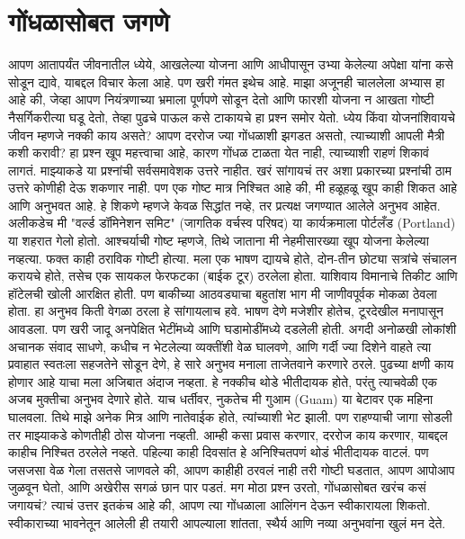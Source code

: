  \chapter{गोंधळासोबत जगणे}
आपण आतापर्यंत जीवनातील ध्येये, आखलेल्या योजना आणि आधीपासून उभ्या केलेल्या अपेक्षा यांना कसे सोडून द्यावे, याबद्दल विचार केला आहे. पण खरी गंमत इथेच आहे. माझा अजूनही चाललेला अभ्यास हा आहे की, जेव्हा आपण नियंत्रणाच्या भ्रमाला पूर्णपणे सोडून देतो आणि फारशी योजना न आखता गोष्टी नैसर्गिकरीत्या घडू देतो, तेव्हा पुढचे पाऊल कसे टाकायचे हा प्रश्न समोर येतो.
ध्येय किंवा योजनांशिवायचे जीवन म्हणजे नक्की काय असते? आपण दररोज ज्या गोंधळाशी झगडत असतो, त्याच्याशी आपली मैत्री कशी करावी? हा प्रश्न खूप महत्त्वाचा आहे, कारण गोंधळ टाळता येत नाही, त्याच्याशी राहणं शिकावं लागतं.
माझ्याकडे या प्रश्नांची सर्वसमावेशक उत्तरे नाहीत. खरं सांगायचं तर अशा प्रकारच्या प्रश्नांची ठाम उत्तरे कोणीही देऊ शकणार नाही. पण एक गोष्ट मात्र निश्चित आहे की, मी हळूहळू खूप काही शिकत आहे आणि अनुभवत आहे. हे शिकणे म्हणजे केवळ सिद्धांत नव्हे, तर प्रत्यक्ष जगण्यात आलेले अनुभव आहेत.
अलीकडेच मी "वर्ल्ड डॉमिनेशन समिट" (जागतिक वर्चस्व परिषद) या कार्यक्रमाला पोर्टलँड (Portland) या शहरात गेलो होतो. आश्चर्याची गोष्ट म्हणजे, तिथे जाताना मी नेहमीसारख्या खूप योजना केलेल्या नव्हत्या. फक्त काही ठराविक गोष्टी होत्या. मला एक भाषण द्यायचे होते, दोन-तीन छोट्या सत्रांचे संचालन करायचे होते, तसेच एक सायकल फेरफटका (बाईक टूर) ठरलेला होता. याशिवाय विमानाचे तिकीट आणि हॉटेलची खोली आरक्षित होती. पण बाकीच्या आठवड्याचा बहुतांश भाग मी जाणीवपूर्वक मोकळा ठेवला होता.
हा अनुभव किती वेगळा ठरला हे सांगायलाच हवे. भाषण देणे मजेशीर होतेच, टूरदेखील मनापासून आवडला. पण खरी जादू अनपेक्षित भेटींमध्ये आणि घडामोडींमध्ये दडलेली होती. अगदी अनोळखी लोकांशी अचानक संवाद साधणे, कधीच न भेटलेल्या व्यक्तींशी वेळ घालवणे, आणि गर्दी ज्या दिशेने वाहते त्या प्रवाहात स्वतःला सहजतेने सोडून देणे, हे सारे अनुभव मनाला ताजेतवाने करणारे ठरले. पुढच्या क्षणी काय होणार आहे याचा मला अजिबात अंदाज नव्हता. हे नक्कीच थोडे भीतीदायक होते, परंतु त्याचवेळी एक अजब मुक्तीचा अनुभव देणारे होते.
याच धर्तीवर, नुकतेच मी गुआम (Guam) या बेटावर एक महिना घालवला. तिथे माझे अनेक मित्र आणि नातेवाईक होते, त्यांच्याशी भेट झाली. पण राहण्याची जागा सोडली तर माझ्याकडे कोणतीही ठोस योजना नव्हती. आम्ही कसा प्रवास करणार, दररोज काय करणार, याबद्दल काहीच निश्चित ठरलेले नव्हते. पहिल्या काही दिवसांत हे अनिश्चितपणं थोडं भीतीदायक वाटलं. पण जसजसा वेळ गेला तसतसे जाणवले की, आपण काहीही ठरवलं नाही तरी गोष्टी घडतात, आपण आपोआप जुळवून घेतो, आणि अखेरीस सगळं छान पार पडतं.
मग मोठा प्रश्न उरतो, गोंधळासोबत खरंच कसं जगायचं?
 त्याचं उत्तर इतकंच आहे की, आपण त्या गोंधळाला आलिंगन देऊन स्वीकारायला शिकतो. स्वीकाराच्या भावनेतून आलेली ही तयारी आपल्याला शांतता, स्थैर्य आणि नव्या अनुभवांना खुलं मन देते.

